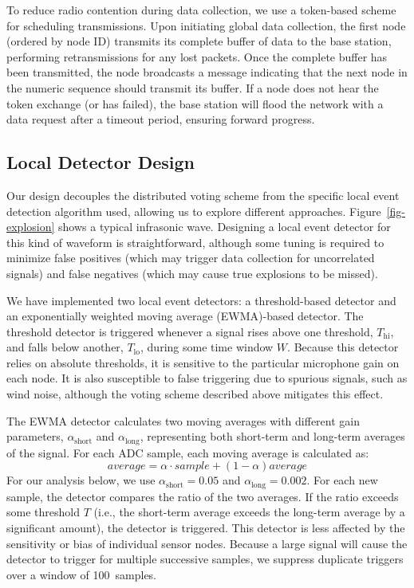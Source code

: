 To reduce radio contention during data collection, we use a token-based
scheme for scheduling transmissions. Upon initiating global data
collection, the first node (ordered by node ID)
transmits its complete buffer of data to the base station, performing
retransmissions for any lost packets. Once the complete buffer has been
transmitted, the node broadcasts a message indicating that the next
node in the numeric sequence should transmit its buffer. If a node
does not hear the token exchange (or has failed), the base station will
flood the network with a data request after a timeout period, ensuring
forward progress.

\subsection{Local Detector Design}

Our design decouples the distributed voting scheme from the specific
local event detection algorithm used, allowing us to explore different
approaches. Figure~\ref{fig-explosion} shows a typical infrasonic
wave.  Designing a local event detector for this kind of waveform is
straightforward, although some tuning is required to minimize false
positives (which may trigger data collection for uncorrelated signals)
and false negatives (which may cause true explosions to be missed).

We have implemented two local event detectors: a threshold-based detector
and an exponentially weighted moving average (EWMA)-based detector. The
threshold detector is triggered whenever a signal rises above one
threshold, $T_\mathrm{hi}$, and falls below another, $T_\mathrm{lo}$,
during some time window $W$.  Because this detector relies on absolute
thresholds, it is sensitive to the particular microphone gain on each
node. It is also susceptible to false triggering due to spurious
signals, such as wind noise, although the voting scheme described above
mitigates this effect.

The EWMA detector calculates two moving averages with different
gain parameters, $\alpha_\mathrm{short}$ and $\alpha_\mathrm{long}$,
representing both short-term and long-term averages of the 
signal. For each ADC sample, each moving average is calculated as:
\[
\mathit{average} = \alpha \cdot \mathit{sample} + (1 - \alpha) \mathit{average}
\]
For our analysis below, we use $\alpha_\mathrm{short} = 0.05$
and $\alpha_\mathrm{long} = 0.002$.
For each new sample, the detector compares the ratio of the two
averages. If the ratio exceeds some threshold $T$ (i.e., the short-term 
average exceeds the long-term average by a significant amount), 
the detector is triggered. This detector is less affected by 
the sensitivity or bias of individual sensor nodes. Because a large
signal will cause the detector to trigger for multiple successive
samples, we suppress duplicate triggers over a window of 100~samples.

